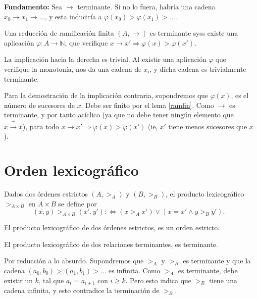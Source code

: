 \textbf{Fundamento:} Sea $\rightarrow$ terminante. Si no lo fuera, habría una
cadena $x_0 \rightarrow x_1 \rightarrow \dots$, y esta induciría a
$\varphi(x_0) > \varphi(x_1) > \dots$.

\begin{lema}
  Una reducción de ramificación finita $(A,\rightarrow)$ es terminante syss
  existe una aplicación $\varphi : A \rightarrow \mathbb{N}$, que verifique
  $x \rightarrow x' \Rightarrow \varphi(x) > \varphi(x').$
\end{lema}

\begin{demo}
  La implicación hacia la derecha es trivial. Al existir una aplicación
  $\varphi$ que verifique la monotonía, nos da una cadena de $x_i$, y dicha
  cadena es trivialmente terminante.

  Para la demostración de la implicación contraria, supondremos que
  $\varphi(x)$, es el número de sucesores de $x$. Debe ser finito por el lema
  \ref{ramfin}. Como $\rightarrow$ es terminante, y por tanto acíclico (ya que
  no debe tener ningún elemento que $x \xrightarrow{+} x$), para todo
  $x \rightarrow x' \Rightarrow \varphi(x) > \varphi(x')$ (ie, $x'$ tiene menos
  sucesores que $x$).
\end{demo}


\section{Orden lexicográfico}\label{orlexi}

\begin{defi} 
  Dados dos órdenes estrictos $(A, >_A)$ y $(B, >_B)$, el producto
  lexicográfico $>_{A \times B}$ en $ A \times B$ se define por
  \[(x,y) >_{A \times B} (x',y') :\Leftrightarrow (x >_A x') \vee (x = x' \wedge y >_B y').\]
\end{defi}

\begin{lema}
  El producto lexicográfico de dos órdenes estrictos, es un orden estricto.
\end{lema}

\begin{teor}
  El producto lexicográfico de dos relaciones terminantes, es terminante.
\end{teor}

\begin{demo}
  Por reducción a lo absurdo. Supondremos que $>_A$ y $>_B$ es terminante y que
  la cadena $(a_0,b_0) > (a_1,b_1) > \dots$ es infinita. Como $>_A$ es
  terminante, debe existir un $k$, tal que $a_i = a_{i+1}$ con $i\geq k$. Pero
  esto indica que $>_B$ tiene una cadena infinita, y esto contradice la
  terminación de $>_B$.
\end{demo}

